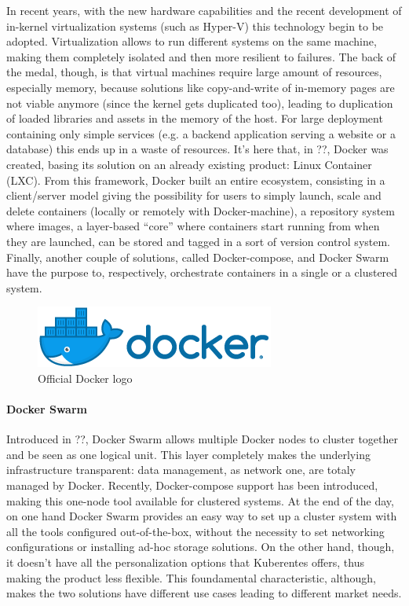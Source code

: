 \documentclass[10pt]{book}
\begin{document}
In recent years, with the new hardware capabilities and the recent development
of in-kernel virtualization systems (such as Hyper-V) this technology begin to
be adopted. Virtualization allows to run different systems on the same machine,
making them completely isolated and then more resilient to failures. The back of
the medal, though, is that virtual machines require large amount of resources,
especially memory, because solutions like copy-and-write of in-memory pages are
not viable anymore (since the kernel gets duplicated too), leading to
duplication of loaded libraries and assets in the memory of the host. For large
deployment containing only simple services (e.g. a backend application serving a
website or a database) this ends up in a waste of resources.  It's here that,
in ??, Docker was created, basing its solution
on an already existing product: Linux Container (LXC). From this framework,
Docker built an entire ecosystem, consisting in a client/server model giving the
possibility for users to simply launch, scale and delete containers (locally or
remotely with Docker-machine), a repository system where images, a layer-based
``core'' where containers start running from when they are launched, can be
stored and tagged in a sort of version control system. Finally, another couple
of solutions, called Docker-compose, and Docker Swarm have the purpose to,
respectively, orchestrate containers in a single or a clustered system.
\begin{figure}[t]
 \centering \includegraphics[scale=0.7]{docker_logo}
 \caption{Official Docker logo}
 \label{chap:intro:img:docker_logo}
\end{figure}


\paragraph{Docker Swarm} Introduced in ??, Docker Swarm allows multiple Docker nodes to cluster together and be
seen as one logical unit. This layer completely makes the underlying
infrastructure transparent: data management, as network one, are totaly managed
by Docker. Recently, Docker-compose support has been introduced, making this
one-node tool available for clustered systems. At the end of the day, on one
hand Docker Swarm provides an easy way to set up a cluster system with all the
tools configured out-of-the-box, without the necessity to set networking
configurations or installing ad-hoc storage solutions. On the other hand,
though, it doesn't have all the personalization options that Kuberentes offers,
thus making the product less flexible. This foundamental characteristic,
although, makes the two solutions have different use cases leading to different
market needs. 
\end{document}
